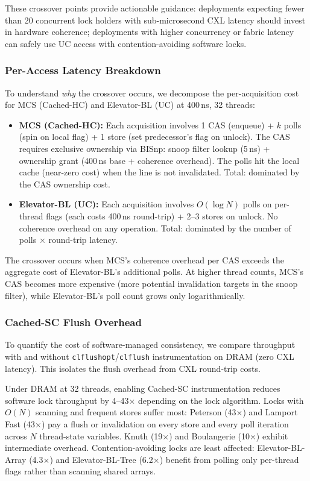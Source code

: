 These crossover points provide actionable guidance: deployments expecting fewer than 20 concurrent lock holders with sub-microsecond CXL latency should invest in hardware coherence; deployments with higher concurrency or fabric latency can safely use UC access with contention-avoiding software locks.

\subsubsection{Per-Access Latency Breakdown}

To understand \emph{why} the crossover occurs, we decompose the per-acquisition cost for MCS (Cached-HC) and Elevator-BL (UC) at 400\,ns, 32 threads:

\begin{itemize}
    \item \textbf{MCS (Cached-HC):} Each acquisition involves 1 CAS (enqueue) + $k$ polls (spin on local flag) + 1 store (set predecessor's flag on unlock). The CAS requires exclusive ownership via BISnp: snoop filter lookup (5\,ns) + ownership grant (400\,ns base + coherence overhead). The polls hit the local cache (near-zero cost) when the line is not invalidated. Total: dominated by the CAS ownership cost.
    \item \textbf{Elevator-BL (UC):} Each acquisition involves $O(\log N)$ polls on per-thread flags (each costs 400\,ns round-trip) + 2--3 stores on unlock. No coherence overhead on any operation. Total: dominated by the number of polls $\times$ round-trip latency.
\end{itemize}

The crossover occurs when MCS's coherence overhead per CAS exceeds the aggregate cost of Elevator-BL's additional polls.
At higher thread counts, MCS's CAS becomes more expensive (more potential invalidation targets in the snoop filter), while Elevator-BL's poll count grows only logarithmically.

\subsubsection{Cached-SC Flush Overhead}

To quantify the cost of software-managed consistency, we compare throughput with and without \texttt{clflushopt}/\texttt{clflush} instrumentation on DRAM (zero CXL latency).
This isolates the flush overhead from CXL round-trip costs.

Under DRAM at 32 threads, enabling Cached-SC instrumentation reduces software lock throughput by 4--43$\times$ depending on the lock algorithm.
Locks with $O(N)$ scanning and frequent stores suffer most: Peterson (43$\times$) and Lamport Fast (43$\times$) pay a flush or invalidation on every store and every poll iteration across $N$ thread-state variables.
Knuth (19$\times$) and Boulangerie (10$\times$) exhibit intermediate overhead.
Contention-avoiding locks are least affected: Elevator-BL-Array (4.3$\times$) and Elevator-BL-Tree (6.2$\times$) benefit from polling only per-thread flags rather than scanning shared arrays.

